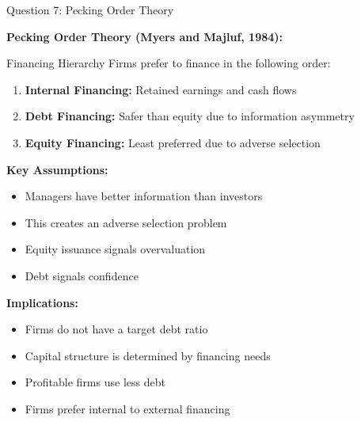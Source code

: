 \documentclass[aspectratio=169]{beamer}
\begin{document}
	
	
	
	\begin{frame}{Question 7: Pecking Order Theory}
		
		\textbf{Pecking Order Theory (Myers and Majluf, 1984):}
		
		\begin{block}{Financing Hierarchy}
			Firms prefer to finance in the following order:
			\begin{enumerate}
				\item \textbf{Internal Financing:} Retained earnings and cash flows
				\item \textbf{Debt Financing:} Safer than equity due to information asymmetry
				\item \textbf{Equity Financing:} Least preferred due to adverse selection
			\end{enumerate}
		\end{block}
		
		\vspace{0.2cm}
		
		\textbf{Key Assumptions:}
		\begin{itemize}
			\item Managers have better information than investors
			\item This creates an adverse selection problem
			\item Equity issuance signals overvaluation
			\item Debt signals confidence
		\end{itemize}
		
		\vspace{0.2cm}
		
		\textbf{Implications:}
		\begin{itemize}
			\item Firms do not have a target debt ratio
			\item Capital structure is determined by financing needs
			\item Profitable firms use less debt
			\item Firms prefer internal to external financing
		\end{itemize}
	\end{frame}
\end{document}
